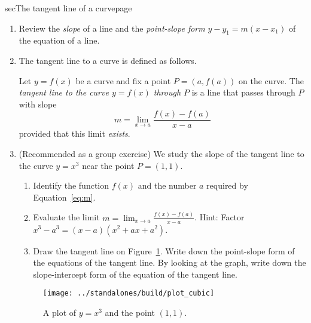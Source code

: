\documentclass[../main]{subfiles}
\begin{document}
%
%
\begin{outline}{sec}{The tangent line of a curve}{page} \label{act:tangent}
  \begin{enumerate}
    \item Review the \emph{slope} of a line and the \emph{point-slope form} \(y - y_{1} = m(x - x_{1})\) of the equation of a line.
    \item {The tangent line to a curve is defined as follows.}
      \begin{mdframed}[style=simple]
        Let \(y = f(x)\) be a curve and fix a point \(P = (a, f(a))\) on the curve.  The \emph{tangent line to the curve \(y = f(x)\) through \(P\)} is a line that passes through \(P\) with slope 
        \begin{equation} \label{eq:m}
          m = \lim_{x \to a} \frac{f(x) - f(a)}{x - a} 
        \end{equation}
        provided that this limit \emph{exists}.
      \end{mdframed}
        
    \item \label{part:tangent1} (Recommended as a group exercise) We study the slope of the tangent line to the curve \(y = x^{3}\) near the point \(P = (1,1)\).
      \begin{enumerate}
        \item Identify the function \(f(x)\) and the number \(a\) required by Equation~\eqref{eq:m}.  
        \item Evaluate the limit \(m = {\lim_{x \to a}} \frac{f(x) - f(a)}{x - a}\). Hint: Factor \(x^{3} - a^{3} = (x - a) (x^{2} + ax + a^{2})\).
        \item Draw the tangent line on Figure~\ref{fig:cubic}. Write down the point-slope form of the equations of the tangent line. By looking at the graph, write down the slope-intercept form of the equation of the tangent line.
      \end{enumerate}
      \begin{figure}
        \centering
        \texttt{[image: ../standalones/build/plot\_cubic]}
        \caption{A plot of \(y = x^{3}\) and the point \((1,1)\).}
        \label{fig:cubic}
      \end{figure}


\end{enumerate}
\end{outline}
\end{document}
